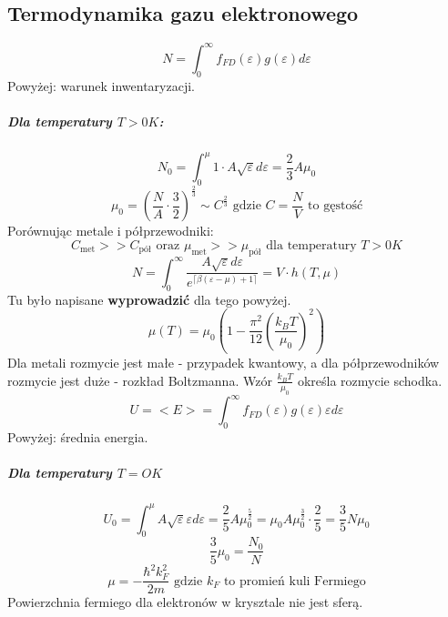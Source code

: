 \documentclass{article}
\begin{document}
		\subsection{Termodynamika gazu elektronowego}
		\begin{equation}
			N = \int_{0}^{\infty}f_{FD}(\varepsilon)g(\varepsilon)d\varepsilon
		\end{equation}
		Powyżej: warunek inwentaryzacji. 
		\subparagraph{Dla temperatury $ T > 0K $:}
		\begin{equation}
			N_0 = \int_{0}^{\mu} 1 \cdot A\sqrt{\varepsilon} d\varepsilon = \frac{2}{3} A\mu_0
		\end{equation}
		\begin{equation}
			\mu_0 = (\frac{N}{A} \cdot \frac{3}{2})^{\frac{2}{3}} \sim C^{\frac{2}{3}}
			\text{ gdzie } C = \frac{N}{V} \text{ to gęstość}
		\end{equation}
		Porównując metale i półprzewodniki:
		\begin{equation}
		C_{\text{met}} >> C_{\text{pół}} \text{ oraz } \mu_{\text{met}} >> \mu_{\text{pół}}
		\text{ dla temperatury } T > 0K
		\end{equation}
		\begin{equation}
			N = \int_{0}^{\infty}\frac{A\sqrt{\varepsilon}d\varepsilon}{e^{\lceil\beta(\varepsilon - \mu)+1\rceil}} =
			V \cdot h(T, \mu)
		\end{equation}
		Tu było napisane \textbf{wyprowadzić} dla tego powyżej.
		\begin{equation}
		\mu(T) = \mu_0(1 - \frac{\pi^2}{12}(\frac{k_BT}{\mu_0})^2)
		\end{equation}
		Dla metali rozmycie jest małe - przypadek kwantowy, a dla półprzewodników rozmycie jest duże - rozkład Boltzmanna. Wzór $ \frac{k_BT}{\mu_0} $ określa rozmycie schodka.
		\begin{equation}
			U = <E> = \int_{0}^{\infty}f_{FD}(\varepsilon)g(\varepsilon)\varepsilon d\varepsilon
		\end{equation}	
		Powyżej: średnia energia.
		\subparagraph{Dla temperatury $ T=OK $}
		\begin{equation}
		U_0 = \int_{0}^{\mu}A\sqrt{\varepsilon}\varepsilon d \varepsilon = 
		\frac{2}{5} A\mu_0^{\frac{5}{2}} = 
		\mu_0 A \mu_0^{\frac{3}{2}}\cdot \frac{2}{5} = 
		\frac{3}{5} N\mu_0
		\end{equation}	
		\begin{equation}
		\frac{3}{5}\mu_0 = \frac{N_0}{N}
		\end{equation}
		\begin{equation}
		\mu = -\frac{\hbar^2k_F^2}{2m} \text{ gdzie } k_F \text{ to promień kuli Fermiego}
		\end{equation}
		Powierzchnia fermiego dla elektronów w krysztale nie jest sferą.
	
	
	
	
	
	
	
\end{document}
